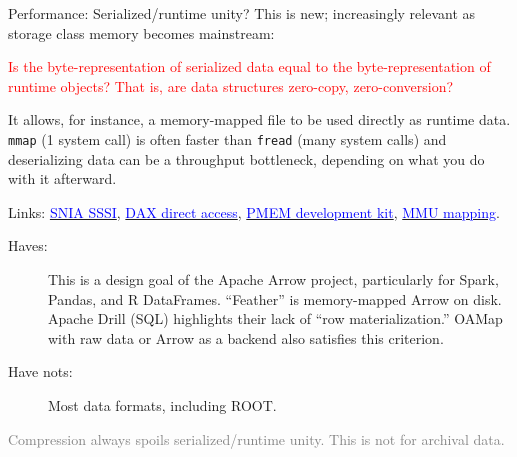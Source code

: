 \documentclass[aspectratio=169]{beamer}
\begin{document}
\begin{frame}{Performance: Serialized/runtime unity?}
\vspace{0.5 cm}
This is new; increasingly relevant as storage class memory becomes mainstream:

\begin{center}
\begin{minipage}{0.9\linewidth}
\textcolor{red}{Is the byte-representation of serialized data equal to the byte-representation of runtime objects? That is, are data structures zero-copy, zero-conversion?}
\end{minipage}
\end{center}

It allows, for instance, a memory-mapped file to be used directly as runtime data. {\tt\small mmap} (1 system call) is often faster than {\tt\small fread} (many system calls) and deserializing data can be a throughput bottleneck, depending on what you do with it afterward.

\vspace{0.25 cm}

Links: \href{https://www.snia.org/forums/sssi}{\textcolor{blue}{SNIA SSSI}}, \href{https://lwn.net/Articles/717953/}{\textcolor{blue}{DAX direct access}}, \href{https://pmem.io/}{\textcolor{blue}{PMEM development kit}}, \href{http://scitechconnect.elsevier.com/memory-management-unit/}{\textcolor{blue}{MMU mapping}}.

\vspace{0.15 cm}

\begin{description}
\item[Haves:] This is a design goal of the Apache Arrow project, particularly for Spark, Pandas, and R DataFrames. ``Feather'' is memory-mapped Arrow on disk. Apache Drill (SQL) highlights their lack of ``row materialization.'' OAMap with raw data or Arrow as a backend also satisfies this criterion.
\item[Have nots:] Most data formats, including ROOT.
\end{description}

\vspace{0.1 cm}
\textcolor{gray}{Compression always spoils serialized/runtime unity. This is not for archival data.}
\end{frame}
\end{document}
